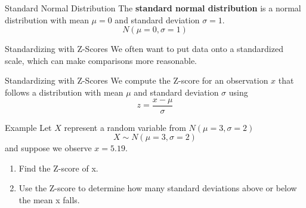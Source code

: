 \begin{frame}{Standard Normal Distribution}
    The \textbf{standard normal distribution} is a normal distribution with mean $\mu=0$ and standard deviation $\sigma=1$.
    \[
        N(\mu=0, \sigma=1)
    \]
\end{frame}

\begin{frame}{Standardizing with Z-Scores}
    We often want to put data onto a standardized scale, which can make comparisons more reasonable.
\end{frame}

\begin{frame}{Standardizing with Z-Scores}
    We compute the Z-score for an observation $x$ that follows a distribution with mean $\mu$ and standard deviation $\sigma$ using
    \[
        z = \frac{x-\mu}{\sigma}
    \]
\end{frame}

\begin{frame}{Example}
    Let $X$ represent a random variable from $N (\mu = 3, \sigma = 2)$
    \[
        X \sim N (\mu = 3, \sigma = 2)
    \]
    and suppose we observe $x = 5.19$.
    \begin{enumerate}
        \item Find the Z-score of x.
        \item Use the Z-score to determine how many standard deviations above or below the mean x falls.
    \end{enumerate}
\end{frame}

